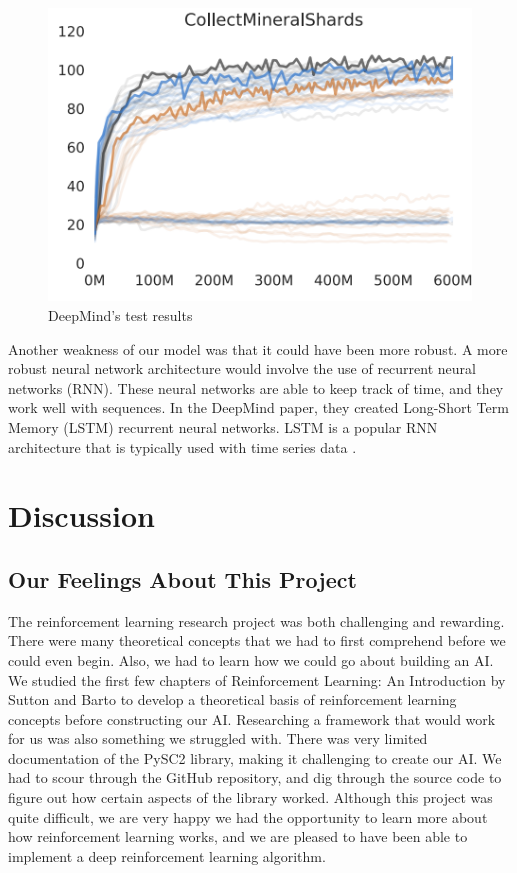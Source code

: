 \documentclass[12pt]{article}
\begin{document}
\begin{figure} [ht!]
    \centering
    \includegraphics[width=.75\textwidth, height=.4\textheight]{deepmindresults.png}
    \caption{DeepMind's test results \cite{Vinyals2017StarCraftIA}}
    \label{fig:test2}
\end{figure}

Another weakness of our model was that it could have been more robust.  A more robust neural network architecture would involve the use of recurrent neural networks (RNN). These neural networks are able to keep track of time, and they work well with sequences. In the DeepMind paper, they created Long-Short Term Memory (LSTM) recurrent neural networks. LSTM is a popular RNN architecture that is typically used with time series data \cite{Vinyals2017StarCraftIA}.

\section*{\Large Discussion}

%
%
\subsection*{Our Feelings About This Project}

The reinforcement learning research project was both challenging and rewarding.  There were many theoretical concepts that we had to first comprehend before we could even begin. Also, we had to learn how we could go about building an AI. We studied the first few chapters of Reinforcement Learning: An Introduction by Sutton and Barto \cite{sutton_barto_2018} to develop a theoretical basis of reinforcement learning concepts before constructing our AI. Researching a framework that would work for us was also something we struggled with. There was very limited documentation of the PySC2 library, making it challenging to create our AI.  We had to scour through the GitHub repository, and dig through the source code to figure out how certain aspects of the library worked. Although this project was quite difficult, we are very happy we had the opportunity to learn more about how reinforcement learning works, and we are pleased to have been able to implement a deep reinforcement learning algorithm.\newpage  
\end{document}
